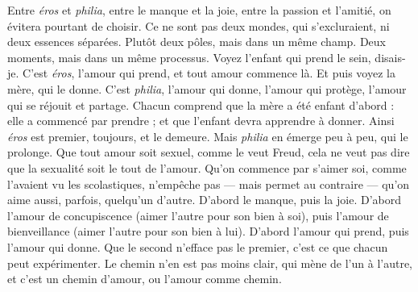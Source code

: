 Entre {\it éros} et {\it philia}, entre le manque et la joie, entre la passion et l'amitié,
on évitera pourtant de choisir. Ce ne sont pas deux mondes, qui s’excluraient,
ni deux essences séparées. Plutôt deux pôles, mais dans un même champ. Deux
moments, mais dans un même processus. Voyez l'enfant qui prend le sein,
disais-je. C’est {\it éros}, l'amour qui prend, et tout amour commence là. Et puis
voyez la mère, qui le donne. C’est {\it philia}, l'amour qui donne, l'amour qui protège,
l'amour qui se réjouit et partage. Chacun comprend que la mère a été
enfant d’abord : elle a commencé par prendre ; et que l’enfant devra apprendre
à donner. Ainsi {\it éros} est premier, toujours, et le demeure. Mais {\it philia} en émerge
peu à peu, qui le prolonge. Que tout amour soit sexuel, comme le veut Freud,
cela ne veut pas dire que la sexualité soit le tout de l’amour. Qu’on commence
par s'aimer soi, comme l'avaient vu les scolastiques, n’empêche pas — mais
permet au contraire — qu’on aime aussi, parfois, quelqu'un d’autre. D'abord le
manque, puis la joie. D’abord l'amour de concupiscence (aimer l’autre pour
son bien à soi), puis l’amour de bienveillance (aimer l’autre pour son bien à
lui). D'abord l'amour qui prend, puis l’amour qui donne. Que le second
n’efface pas le premier, c’est ce que chacun peut expérimenter. Le chemin n’en
est pas moins clair, qui mène de l’un à l’autre, et c’est un chemin d’amour, ou
l'amour comme chemin.

